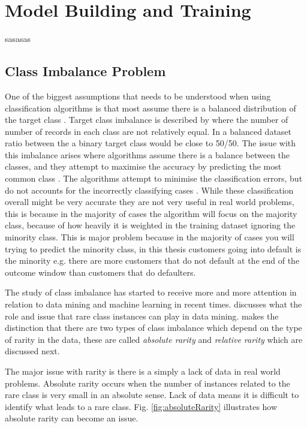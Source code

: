\section{Model Building and Training}
sasasas
\subsection{Class Imbalance Problem}
One of the biggest assumptions that needs to be understood when using classification algorithms is that most assume there is a balanced distribution of the target class \citep{japkowicz_class_2000}. Target class imbalance is described by  \citep{chawla_smote:_2002} where the number of number of records in each class are not relatively equal. In a balanced dataset ratio between the a binary target class would be close to 50/50. The issue with this imbalance arises where algorithms assume there is a balance between the classes, and they attempt to maximise the accuracy by predicting the most common class \citep{drummond_severe_2005}. The algorithms attempt to minimise the classification errors, but do not accounts for the incorrectly classifying cases \citep{seiffert_improving_2009}. While these classification overall might be very accurate they are not very useful in real world problems, this is because in the majority of cases the algorithm will focus on the majority class, because of how heavily it is weighted in the training dataset ignoring the minority class. This is major problem because in the majority of cases you will trying to predict the minority class, in this thesis customers going into default is the minority e.g. there are more customers that do not default at the end of the outcome window than customers that do defaulters.

The study of class imbalance has started to receive more and more attention in relation to data mining and machine learning in recent times. \cite{weiss_mining_2004} discusses what the role and issue that rare class instances can play in data mining. \cite{weiss_mining_2004} makes the distinction that there are two types of class imbalance which depend on the type of rarity in the data, these are called \textit{absolute rarity} and \textit{relative rarity} which are discussed next.

The major issue with rarity is there is a simply a lack of data in real world problems. Absolute rarity occurs when the number of instances related to the rare class is very small in an absolute sense. Lack of data means it is difficult to identify what leads to a rare class. Fig. \ref{fig:absoluteRarity} illustrates how absolute rarity can become an issue.

